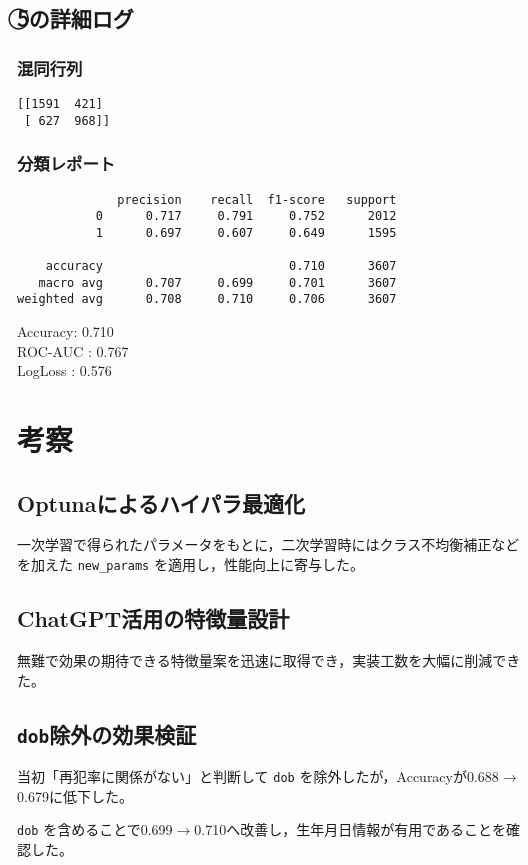\documentclass[a4paper,11pt]{article}
\newcommand{\circled}[1]{\textcircled{\scriptsize #1}}
\begin{document}
\subsection{\circled{5}の詳細ログ}
\subsubsection{混同行列}
\begin{verbatim}
[[1591  421]
 [ 627  968]]
\end{verbatim}

\subsubsection{分類レポート}
\begin{verbatim}
              precision    recall  f1-score   support
           0      0.717     0.791     0.752      2012
           1      0.697     0.607     0.649      1595

    accuracy                          0.710      3607
   macro avg      0.707     0.699     0.701      3607
weighted avg      0.708     0.710     0.706      3607
\end{verbatim}

Accuracy: 0.710\\
ROC-AUC : 0.767\\
LogLoss : 0.576

\section{考察}
\subsection{Optunaによるハイパラ最適化}
一次学習で得られたパラメータをもとに，二次学習時にはクラス不均衡補正などを加えた \texttt{new\_params} を適用し，性能向上に寄与した。

\subsection{ChatGPT活用の特徴量設計}
無難で効果の期待できる特徴量案を迅速に取得でき，実装工数を大幅に削減できた。

\subsection{\texttt{dob}除外の効果検証}
当初「再犯率に関係がない」と判断して \texttt{dob} を除外したが，Accuracyが0.688$\rightarrow$0.679に低下した。\par
\texttt{dob} を含めることで0.699$\rightarrow$0.710へ改善し，生年月日情報が有用であることを確認した。
\end{document}
